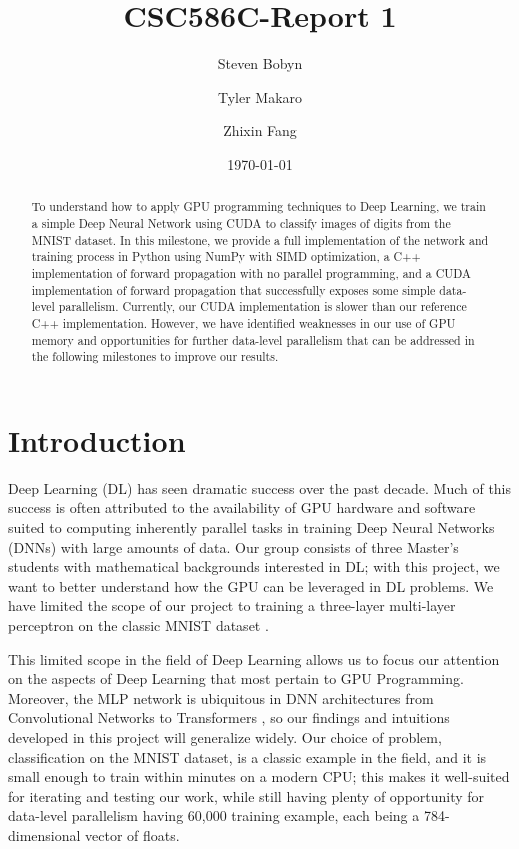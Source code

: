\documentclass[sigconf,authorversion,nonacm]{acmart}
\title{CSC586C-Report 1}
\author{Steven Bobyn \and Tyler Makaro \and Zhixin Fang}
\date{\today}
\begin{document}
\begin{abstract}
  To understand how to apply GPU programming techniques to Deep Learning, we train a simple Deep Neural Network using CUDA to classify images of digits from the MNIST dataset. In this milestone, we provide a full implementation of the network and training process in Python using NumPy with SIMD optimization, a C++ implementation of forward propagation with no parallel programming, and a CUDA implementation of forward propagation that successfully exposes some simple data-level parallelism. Currently, our CUDA implementation is slower than our reference C++ implementation. However, we have identified weaknesses in our use of GPU memory and opportunities for further data-level parallelism that can be addressed in the following milestones to improve our results.
  
  \end{abstract}

\maketitle

\section{Introduction}
Deep Learning (DL) has seen dramatic success over the past decade. Much of this success is often attributed to the availability of GPU hardware and software suited to computing inherently parallel tasks in training Deep Neural Networks (DNNs) with large amounts of data. Our group consists of three Master's students with mathematical backgrounds interested in DL; with this project, we want to better understand how the GPU can be leveraged in DL problems. We have limited the scope of our project to training a three-layer multi-layer perceptron \cite{perceptron} on the classic MNIST dataset \cite{mnist}.

This limited scope in the field of Deep Learning allows us to focus our attention on the aspects of Deep Learning that most pertain to GPU Programming. Moreover, the MLP network is ubiquitous in DNN architectures from Convolutional Networks \cite{alexnet} to Transformers \cite{transformer}, so our findings and intuitions developed in this project will generalize widely. Our choice of problem, classification on the MNIST dataset, is a classic example in the field, and it is small enough to train within minutes on a modern CPU; this makes it well-suited for iterating and testing our work, while still having plenty of opportunity for data-level parallelism having 60,000 training example, each being a 784-dimensional vector of floats.
\end{document}
